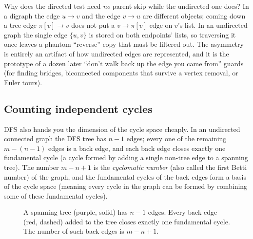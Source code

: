 \begin{whybox}
Why does the directed test need \emph{no} parent skip while the undirected one does? In a digraph the edge $u\to v$ and the edge $v\to u$ are different objects; coming down a tree edge $\pi[v]\to v$ does not put a $v\to\pi[v]$ edge on $v$'s list. In an undirected graph the single edge $\{u,v\}$ is stored on both endpoints' lists, so traversing it once leaves a phantom ``reverse'' copy that must be filtered out. The asymmetry is entirely an artifact of how undirected edges are represented, and it is the prototype of a dozen later ``don't walk back up the edge you came from'' guards (for finding bridges, biconnected components that survive a vertex removal, or Euler tours).
\end{whybox}

\subsection{Counting independent cycles}

DFS also hands you the dimension of the cycle space cheaply. In an undirected connected graph the DFS tree has $n-1$ edges; every one of the remaining $m-(n-1)$ edges is a back edge, and each back edge closes exactly one fundamental cycle (a cycle formed by adding a single non-tree edge to a spanning tree). The number $m-n+1$ is the \emph{cyclomatic number} (also called the first Betti number) of the graph, and the fundamental cycles of the back edges form a basis of the cycle space (meaning every cycle in the graph can be formed by combining some of these fundamental cycles).


\begin{figure}[H]
\centering
{}
\caption{A spanning tree (purple, solid) has $n-1$ edges. Every back edge (red, dashed) added to the tree closes exactly one fundamental cycle. The number of such back edges is $m-n+1$.}
\label{ch03:fig-fundamental}
\end{figure}

